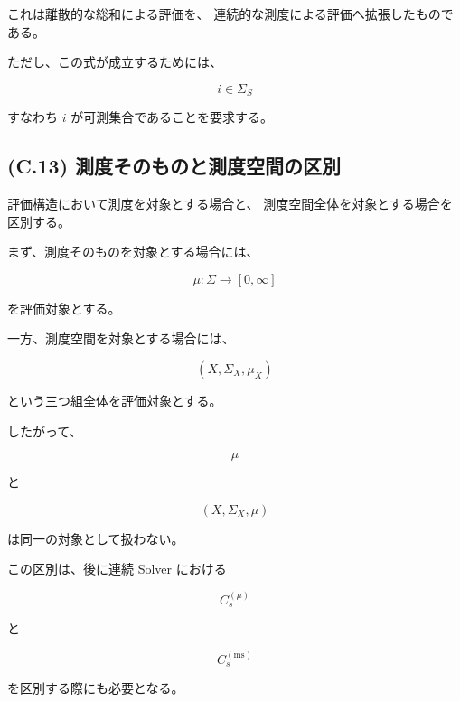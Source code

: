 \documentclass[a4paper,11pt]{article}
\begin{document}
これは離散的な総和による評価を、
連続的な測度による評価へ拡張したものである。

ただし、この式が成立するためには、

\begin{equation}
    i\in\Sigma_S
\end{equation}

すなわち $i$ が可測集合であることを要求する。


\subsection{(C.13) 測度そのものと測度空間の区別}
\label{subsec:C13}

評価構造において測度を対象とする場合と、
測度空間全体を対象とする場合を区別する。

まず、測度そのものを対象とする場合には、

\begin{equation}
    \mu:
    \Sigma\to[0,\infty]
\end{equation}

を評価対象とする。

一方、測度空間を対象とする場合には、

\begin{equation}
    (X,\Sigma_X,\mu_X)
\end{equation}

という三つ組全体を評価対象とする。

したがって、

\begin{equation}
    \mu
\end{equation}

と

\begin{equation}
    (X,\Sigma_X,\mu)
\end{equation}

は同一の対象として扱わない。

この区別は、後に連続 Solver における

\begin{equation}
    C_s^{(\mu)}
\end{equation}

と

\begin{equation}
    C_s^{(\mathrm{ms})}
\end{equation}

を区別する際にも必要となる。
\end{document}
